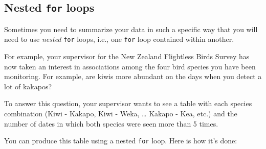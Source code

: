 \documentclass[
]{book}
\begin{document}
\hypertarget{nested-for-loops}{%
\subsection*{\texorpdfstring{Nested \texttt{for} loops}{Nested for loops}}\label{nested-for-loops}}

Sometimes you need to summarize your data in such a specific way that you will need to use \emph{nested} \texttt{for} loops, i.e., one \texttt{for} loop contained within another.

For example, your supervisor for the New Zealand Flightless Birds Survey has now taken an interest in associations among the four bird species you have been monitoring. For example, are kiwis more abundant on the days when you detect a lot of kakapos?

To answer this question, your supervisor wants to see a table with each species combination (Kiwi - Kakapo, Kiwi - Weka, \ldots{} Kakapo - Kea, etc.) and the number of dates in which both species were seen more than 5 times.

You can produce this table using a nested \texttt{for} loop. Here is how it's done:
\end{document}
